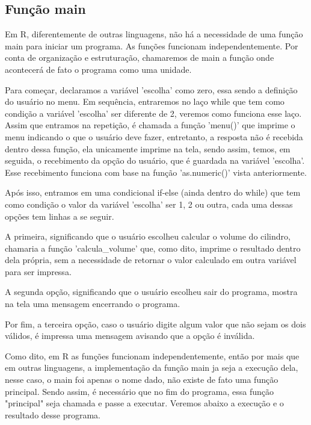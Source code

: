       \subsection{Função main}
      Em R, diferentemente de outras linguagens, não há a necessidade de uma função main para iniciar um programa. As funções funcionam independentemente. Por conta de organização e estruturação, chamaremos de main a função onde acontecerá de fato o programa como uma unidade.\par Para começar, declaramos a variável 'escolha' como zero, essa sendo a definição do usuário no menu. Em sequência, entraremos no laço while que tem como condição a variável 'escolha' ser diferente de 2, veremos como funciona esse laço. Assim que entramos na repetição, é chamada a função 'menu()' que imprime o menu indicando o que o usuário deve fazer, entretanto, a resposta não é recebida dentro dessa função, ela unicamente imprime na tela, sendo assim, temos, em seguida, o recebimento da opção do usuário, que é guardada na variável 'escolha'. Esse recebimento funciona com base na função 'as.numeric()' vista anteriormente.\par Após isso, entramos em uma condicional if-else (ainda dentro do while) que tem como condição o valor da variável 'escolha' ser 1, 2 ou outra, cada uma dessas opções tem linhas a se seguir.\par A primeira, significando que o usuário escolheu calcular o volume do cilindro, chamaria a função 'calcula\_volume' que, como dito, imprime o resultado dentro dela própria, sem a necessidade de retornar o valor calculado em outra variável para ser impressa.\par A segunda opção, significando que o usuário escolheu sair do programa, mostra na tela uma mensagem encerrando o programa.\par Por fim, a terceira opção, caso o usuário digite algum valor que não sejam os dois válidos, é impressa uma mensagem avisando que a opção é inválida.\par Como dito, em R as funções funcionam independentemente, então por mais que em outras linguagens, a implementação da função main ja seja a execução dela, nesse caso, o main foi apenas o nome dado, não existe de fato uma função principal. Sendo assim, é necessário que no fim do programa, essa função "principal" seja chamada e passe a executar.
	  Veremos abaixo a execução e o resultado desse programa.
